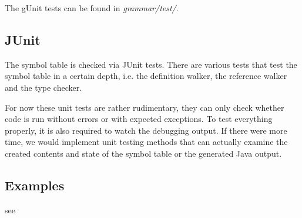 The gUnit tests can be found in \emph{grammar/test/}.


\subsection{JUnit}
The symbol table is checked via JUnit tests. There are various tests that
test the symbol table in a certain depth, i.e. the definition walker, the
reference walker and the type checker.

For now these unit tests are rather rudimentary, they can only check whether
code is run without errors or with expected exceptions. To test everything
properly, it is also required to watch the debugging output.
If there were more time, we would implement unit testing methods that can
actually examine the created contents and state of the symbol table or the
generated Java output.


\subsection{Examples}
see 
